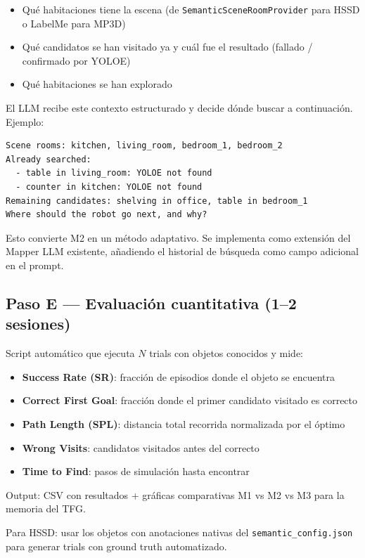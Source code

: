\documentclass[11pt,a4paper]{article}
\begin{document}
\begin{itemize}
  \item Qué habitaciones tiene la escena
        (de \texttt{SemanticSceneRoomProvider} para HSSD o LabelMe para MP3D)
  \item Qué candidatos se han visitado ya y cuál fue el resultado
        (fallado / confirmado por YOLOE)
  \item Qué habitaciones se han explorado
\end{itemize}

El LLM recibe este contexto estructurado y decide dónde buscar a continuación. Ejemplo:

\begin{verbatim}
Scene rooms: kitchen, living_room, bedroom_1, bedroom_2
Already searched:
  - table in living_room: YOLOE not found
  - counter in kitchen: YOLOE not found
Remaining candidates: shelving in office, table in bedroom_1
Where should the robot go next, and why?
\end{verbatim}

Esto convierte M2 en un método adaptativo. Se implementa como extensión del Mapper LLM
existente, añadiendo el historial de búsqueda como campo adicional en el prompt.

\subsection{Paso E --- Evaluación cuantitativa (1--2 sesiones)}

Script automático que ejecuta $N$ trials con objetos conocidos y mide:

\begin{itemize}
  \item \textbf{Success Rate (SR)}: fracción de episodios donde el objeto se encuentra
  \item \textbf{Correct First Goal}: fracción donde el primer candidato visitado es correcto
  \item \textbf{Path Length (SPL)}: distancia total recorrida normalizada por el óptimo
  \item \textbf{Wrong Visits}: candidatos visitados antes del correcto
  \item \textbf{Time to Find}: pasos de simulación hasta encontrar
\end{itemize}

Output: CSV con resultados + gráficas comparativas M1 vs M2 vs M3 para la memoria del TFG.

Para HSSD: usar los objetos con anotaciones nativas del \texttt{semantic\_config.json}
para generar trials con ground truth automatizado.
\end{document}
